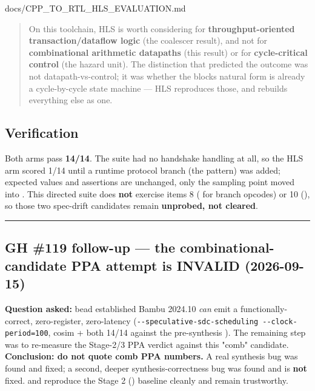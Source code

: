 \begin{relocated}{docs/CPP_TO_RTL_HLS_EVALUATION.md}
\begin{quote}
On this toolchain, HLS is worth considering for
\textbf{throughput-oriented transaction/\allowbreak{}dataflow logic}
(the coalescer result), and not for \textbf{combinational arithmetic
datapaths} (this result) or for \textbf{cycle-critical control} (the
hazard unit). The distinction that predicted the outcome was not
datapath-vs-control; it was whether the block\textquotesingle s natural
form is already a cycle-by-cycle state machine --- HLS reproduces those,
and rebuilds everything else as one.
\end{quote}

\subsection{Verification}\label{tm:dec:cpp-to-rtl-hls-evaluation:verification}

Both arms pass  \textbf{14/14}.
The suite had no handshake handling at all, so the HLS arm scored 1/14
until a runtime protocol branch (the  pattern)
was added; expected values and assertions are unchanged, only the
sampling point moved into . This directed suite does
\textbf{not} exercise  items 8 ( for
branch opcodes) or 10 (), so those two spec-drift
candidates remain \textbf{unprobed, not cleared}.

\begin{center}\rule{0.5\linewidth}{0.5pt}\end{center}

\subsection{\texorpdfstring{GH \#119  follow-up --- the
combinational-candidate PPA attempt is INVALID
(2026-09-15)}{GH \#119  follow-up --- the combinational-candidate PPA attempt is INVALID (2026-09-15)}}\label{tm:dec:cpp-to-rtl-hls-evaluation:gh-119-egt-follow-up-the-combinational-candidate-ppa-attempt-is-invalid-2026-09-15}

\textbf{Question asked:} bead  established Bambu 2024.10
\emph{can} emit a functionally-correct, zero-register, zero-latency
(\texttt{-\allowbreak{}-\allowbreak{}speculative-\allowbreak{}sdc-\allowbreak{}scheduling\ -\allowbreak{}-\allowbreak{}clock-\allowbreak{}period=\allowbreak{}100},
cosim +  both 14/14 against the pre-synthesis
). The remaining step was to re-measure the Stage-2/3 PPA
verdict against this "comb" candidate. \textbf{Conclusion: do not quote
comb PPA numbers.} A real synthesis bug was found and fixed; a second,
deeper synthesis-correctness bug was found and is \textbf{not} fixed.
 and  reproduce the Stage 2 () baseline
cleanly and remain trustworthy.


\end{relocated}
